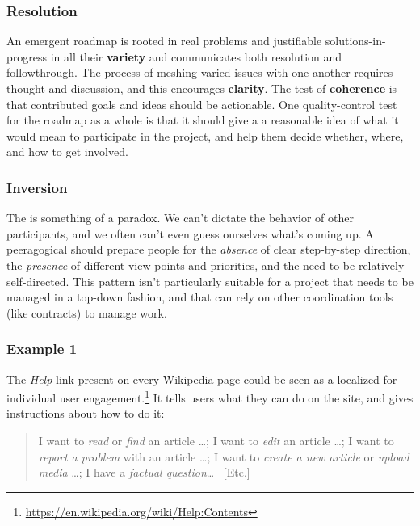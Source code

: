 \subsubsection*{Resolution}
An emergent roadmap is rooted in real problems and justifiable
solutions-in-progress in all their \textbf{variety} and communicates
both resolution and followthrough.  The process of meshing varied
issues with one another requires thought and discussion, and this
encourages \textbf{clarity}.  The test of \textbf{coherence} is that
contributed goals and ideas should be actionable.
%
One quality-control test for the roadmap as a whole is that it should
give a  a reasonable idea of what it would
mean to participate in the project, and help them decide whether,
where, and how to get involved.

\subsubsection*{Inversion}
The  is something of a paradox.  We can't dictate
the behavior of other participants, and we often can't even guess
ourselves what's coming up.  A peeragogical 
should prepare people for the \emph{absence} of clear step-by-step
direction, the \emph{presence} of different view points and
priorities, and the need to be relatively self-directed.  This pattern
isn't particularly suitable for a project that needs to be managed in
a top-down fashion, and that can rely on other coordination tools
(like contracts) to manage work.

\subsubsection*{Example 1}  The \emph{Help} link present on every Wikipedia page could be seen as a
localized  for individual user
engagement.\footnote{\url{https://en.wikipedia.org/wiki/Help:Contents}}
It tells users what they can do on the site, and gives instructions
about how to do it:

\begin{quotation}
\noindent 
I want to \emph{read} or \emph{find} an article \ldots; 
I want to \emph{edit} an article \ldots;
I want to \emph{report a problem} with an article \ldots;
I want to \emph{create a new article} or \emph{upload media} \ldots;
I have a \emph{factual question}\ldots
~[Etc.]
\end{quotation}

